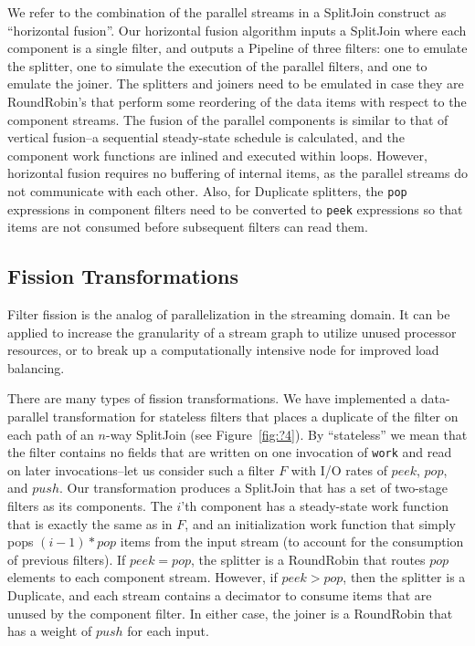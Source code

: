 We refer to the combination of the parallel streams in a SplitJoin
construct as ``horizontal fusion''.  Our horizontal fusion algorithm
inputs a SplitJoin where each component is a single filter, and
outputs a Pipeline of three filters: one to emulate the splitter, one
to simulate the execution of the parallel filters, and one to emulate
the joiner.  The splitters and joiners need to be emulated in case
they are RoundRobin's that perform some reordering of the data items
with respect to the component streams.  The fusion of the parallel
components is similar to that of vertical fusion--a sequential
steady-state schedule is calculated, and the component work functions
are inlined and executed within loops.  However, horizontal fusion
requires no buffering of internal items, as the parallel streams do
not communicate with each other.  Also, for Duplicate splitters, the
{\tt pop} expressions in component filters need to be converted to
{\tt peek} expressions so that items are not consumed before
subsequent filters can read them.

\subsection{Fission Transformations}

Filter fission is the analog of parallelization in the streaming
domain.  It can be applied to increase the granularity of a stream
graph to utilize unused processor resources, or to break up a
computationally intensive node for improved load balancing.  

There are many types of fission transformations.  We have implemented
a data-parallel transformation for stateless filters that places a
duplicate of the filter on each path of an $n$-way SplitJoin (see
Figure~\ref{fig:?4}).  By ``stateless'' we mean that the filter
contains no fields that are written on one invocation of {\tt work}
and read on later invocations--let us consider such a filter $F$ with
I/O rates of $peek$, $pop$, and $push$.  Our transformation produces a
SplitJoin that has a set of two-stage filters as its components.  The
$i$'th component has a steady-state work function that is exactly the
same as in $F$, and an initialization work function that simply pops
$(i-1)*pop$ items from the input stream (to account for the
consumption of previous filters).  If $peek=pop$, the splitter is a
RoundRobin that routes $pop$ elements to each component stream.
However, if $peek>pop$, then the splitter is a Duplicate, and each
stream contains a decimator to consume items that are unused by the
component filter.  In either case, the joiner is a RoundRobin that has
a weight of $push$ for each input.

